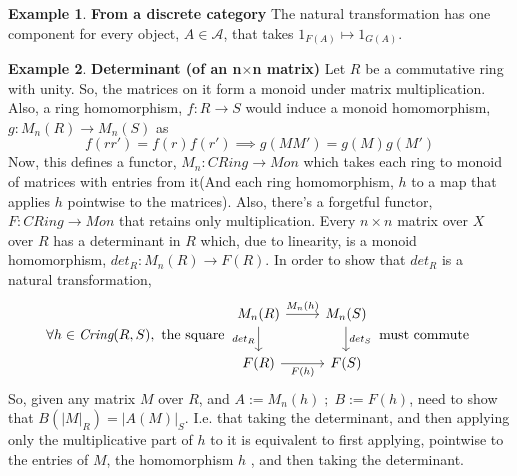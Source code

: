 \documentclass{article}
\theoremstyle{definition}
\newtheorem{example}{Example}[section]
\theoremstyle{definition}
\theoremstyle{definition}
\theoremstyle{definition}
\begin{document}
\begin{example}{\textbf{From a discrete category}} %
	The natural transformation has one component for every object, $A \in \mathcal{A}$, that takes $1_{F(A)}\mapsto 1_{G(A)}$.
\end{example}
\begin{example}{\textbf{Determinant (of an n$\times$n matrix)}} %
	Let $R$ be a commutative ring with unity. So, the matrices on it form a monoid under matrix multiplication. Also, a ring homomorphism,
	$f: R \rightarrow S$ would induce a monoid homomorphism, $g:M_n(R)\rightarrow M_n(S) $ as
	\[ f(rr')=f(r)f(r') \implies g(MM')= g(M)g(M') \]
	Now, this defines a functor, $M_n: \textit{CRing} \rightarrow \textit{Mon}$ which takes each ring to monoid of
	matrices with entries from it(And each ring homomorphism, $h$ to a map that applies $h$ pointwise to the matrices). Also, there's a forgetful functor, $F:\textit{CRing} \rightarrow \textit{Mon}$
	that retains only multiplication.
	Every $n \times n$ matrix over $X$ over $R$ has a determinant in $R$ which, due to linearity, is a monoid homomorphism,
	$det_R: M_n(R) \rightarrow F(R)$. In order to show that $det_R$ is a natural transformation,
	\[
\forall h \in \textit{Cring}(R,S), \text{ the square }
\begin{tikzcd}
M_n(R) \arrow[swap]{d}{det_R} \arrow{r}{M_n(h)}
	& M_n(S) \arrow{d}{det_S}\\
F(R) \arrow[swap]{r}{F(h)}
	& F(S)
\end{tikzcd}
\text{ must commute }
	\]
	So, given any matrix $M$ over $R$, and $A:= M_n(h)\; ; \; B:= F(h)$, need to show that $ B(|M|_R)=|A(M)|_S $.
	I.e. that taking the determinant, and then  applying only the multiplicative part of $h$ to it
	is equivalent to
	first applying, pointwise to the entries of $M$, the homomorphism $h$ , and then taking the determinant.
\end{example}
\end{document}
